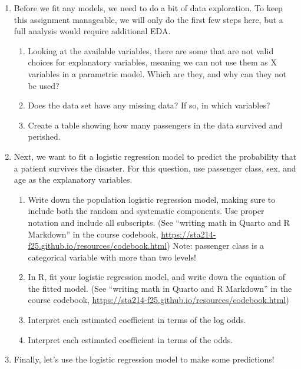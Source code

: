 \documentclass[11pt]{article}
\begin{document}
\begin{enumerate}
\item Before we fit any models, we need to do a bit of data exploration. To keep this assignment manageable, we will only do the first few steps here, but a full analysis would require additional EDA.

\begin{enumerate}
\item Looking at the available variables, there are some that are not valid choices for explanatory variables, meaning we can not use them as X variables in a parametric model. Which are they, and why can they not be used?

\item Does the data set have any missing data? If so, in which variables?

\item Create a table showing how many passengers in the data survived and perished.
\end{enumerate}

\item Next, we want to fit a logistic regression model to predict the probability that a patient survives the disaster. For this question, use passenger class, sex, and age as the explanatory variables.

\begin{enumerate}
\item Write down the population logistic regression model, making sure to include both the random and systematic components. Use proper notation and include all subscripts. (See ``writing math in Quarto and R Markdown'' in the course codebook, \url{https://sta214-f25.github.io/resources/codebook.html}) Note: passenger class is a categorical variable with more than two levels! 

\item In R, fit your logistic regression model, and write down the equation of the fitted model. (See ``writing math in Quarto and R Markdown'' in the course codebook, \url{https://sta214-f25.github.io/resources/codebook.html})

\item Interpret each estimated coefficient in terms of the log odds.

\item Interpret each estimated coefficient in terms of the odds.
\end{enumerate}

\item Finally, let's use the logistic regression model to make some predictions!


\end{enumerate}
\end{document}
